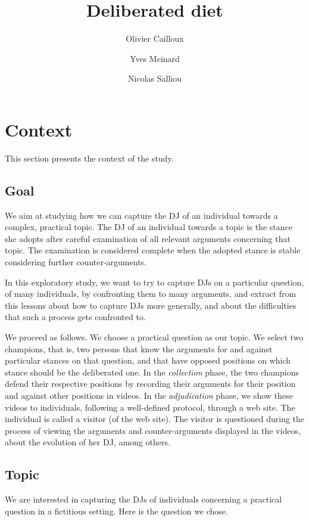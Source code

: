 \documentclass[version=3.21, pagesize, twoside=off, bibliography=totoc, DIV=calc, fontsize=12pt, a4paper]{scrartcl}
\title{Deliberated diet}
\author{Olivier Cailloux}
\author{Yves Meinard}
\affil{Université Paris-Dauphine, PSL Research University, CNRS, LAMSADE, 75016 PARIS, FRANCE}
\author{Nicolas Salliou}
\affil{Affiliation}
\begin{document}
\maketitle

\section{Context}
This section presents the context of the study.
 
\subsection{Goal}
We aim at studying how we can capture the \ac{DJ} of an individual towards a complex, practical topic. The \ac{DJ} \citep{cailloux_formal_2020} of an individual towards a topic is the stance she adopts after careful examination of all relevant arguments concerning that topic. The examination is considered complete when the adopted stance is stable considering further counter-arguments.

In this exploratory study, we want to try to capture \acp{DJ} on a particular question, of many individuals, by confronting them to many arguments, and extract from this lessons about how to capture \acp{DJ} more generally, and about the difficulties that such a process gets confronted to. 

We proceed as follows. We choose a practical question as our topic. We select two champions, that is, two persons that know the arguments for and against particular stances on that question, and that have opposed positions on which stance should be the deliberated one. In the \emph{collection} phase, the two champions defend their respective positions by recording their arguments for their position and against other positions in videos. In the \emph{adjudication} phase, we show these videos to individuals, following a well-defined protocol, through a web site. The individual is called a visitor (of the web site). The visitor is questioned during the process of viewing the arguments and counter-arguments displayed in the videos, about the evolution of her \ac{DJ}, among others.

\subsection{Topic}
\label{sec:topic}
We are interested in capturing the \acp{DJ} of individuals concerning a practical question in a fictitious setting. Here is the question we chose.
\end{document}
